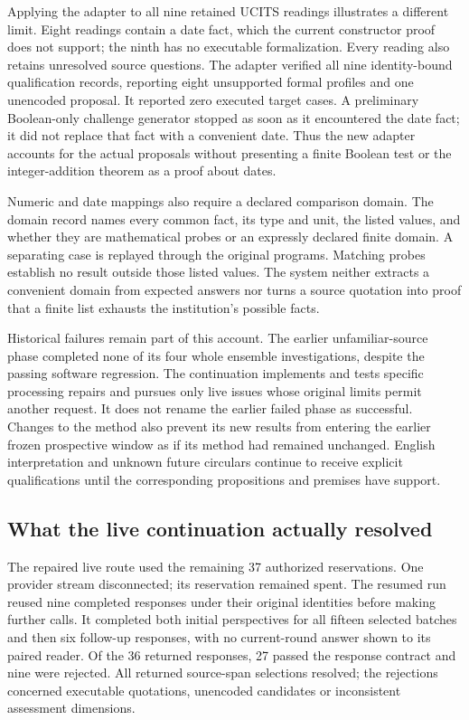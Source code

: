 \documentclass[12pt,a4paper,oneside,openany]{book}
\begin{document}
Applying the adapter to all nine retained UCITS readings illustrates a different
limit. Eight readings contain a date fact, which the current constructor proof
does not support; the ninth has no executable formalization. Every reading also
retains unresolved source questions. The adapter verified all nine identity-bound
qualification records, reporting eight unsupported formal profiles and one
unencoded proposal. It reported zero executed target cases. A preliminary
Boolean-only challenge generator stopped as soon as it encountered the date
fact; it did not replace that fact with a convenient date. Thus the new adapter
accounts for the actual proposals without presenting a finite Boolean test or
the integer-addition theorem as a proof about dates.

Numeric and date mappings also require a declared comparison domain. The
domain record names every common fact, its type and unit, the listed values,
and whether they are mathematical probes or an expressly declared finite
domain. A separating case is replayed through the original programs. Matching
probes establish no result outside those listed values. The system neither
extracts a convenient domain from expected answers nor turns a source quotation
into proof that a finite list exhausts the institution's possible facts.

Historical failures remain part of this account. The earlier unfamiliar-source
phase completed none of its four whole ensemble investigations, despite the
passing software regression. The continuation implements and tests specific
processing repairs and pursues only live issues whose original limits permit
another request. It does not rename the earlier failed phase as successful.
Changes to the method also prevent its new results from entering the earlier
frozen prospective window as if its method had remained unchanged. English
interpretation and unknown future circulars continue to receive explicit
qualifications until the corresponding propositions and premises have support.

\subsection{What the live continuation actually resolved}

The repaired live route used the remaining 37 authorized reservations. One
provider stream disconnected; its reservation remained spent. The resumed run
reused nine completed responses under their original identities before making
further calls. It completed both initial perspectives for all fifteen selected
batches and then six follow-up responses, with no current-round answer shown
to its paired reader. Of the 36 returned responses, 27 passed the response
contract and nine were rejected. All returned source-span selections resolved;
the rejections concerned executable quotations, unencoded candidates or
inconsistent assessment dimensions.
\end{document}
